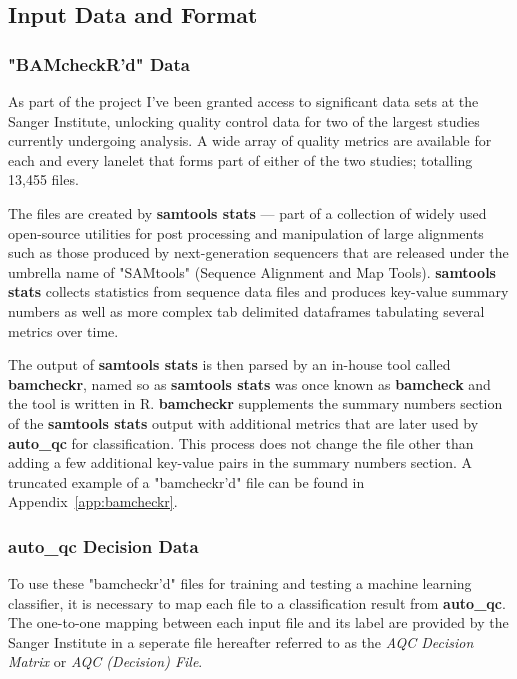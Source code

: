 \subsection{Input Data and Format}
\subsubsection{"BAMcheckR'd" Data}

As part of the project I've been granted access to significant data sets at the
Sanger Institute, unlocking quality control data for two of the largest studies
currently undergoing analysis. A wide array of quality metrics are available for
each and every lanelet that forms part of either of the two studies; totalling
13,455 files.


The files are created by \textbf{samtools stats} --- part of a collection of
widely used open-source utilities for post processing and manipulation of large
alignments such as those produced by next-generation sequencers that are
released under the umbrella name of "SAMtools"\citep{samtools} (Sequence Alignment and Map
Tools). \textbf{samtools stats} collects statistics from sequence data files %
and produces key-value summary numbers as well as more complex tab delimited
dataframes tabulating several metrics over time.

The output of \textbf{samtools stats} is then parsed by an in-house tool called
\textbf{bamcheckr}, named so as \textbf{samtools stats} was once known as
\textbf{bamcheck} and the tool is written in R. \textbf{bamcheckr} supplements
the summary numbers section of the \textbf{samtools stats} output with
additional metrics that are later used by \textbf{auto\_qc} for classification.
This process does not change the file other than adding a few additional
key-value pairs in the summary numbers section. A truncated example of a
"bamcheckr'd" file can be found in Appendix~\ref{app:bamcheckr}.

\subsubsection{auto\_qc Decision Data}
To use these "bamcheckr'd" files for training and testing a machine learning
classifier, it is necessary to map each file to a classification result from
\textbf{auto\_qc}. The one-to-one mapping between each input file and its label
are provided by the Sanger Institute in a seperate file hereafter referred to as
the \textit{AQC Decision Matrix} or \textit{AQC (Decision) File}.

